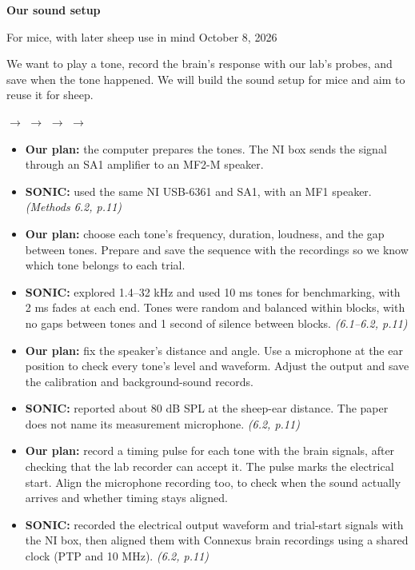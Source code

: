 \documentclass[12pt,letterpaper]{article}
\newcommand{\topic}[1]{\vspace{7pt}{\large\bfseries #1}\par}
\begin{document}
{\LARGE\bfseries Our sound setup}\par
{\color{muted}For mice, with later sheep use in mind \hfill October 8, 2026}\par

We want to play a tone, record the brain's response with our lab's probes, and save when the tone happened. We will build the sound setup for mice and aim to reuse it for sheep.

\topic{How the parts fit together}
\begin{center}
{\small{} $\rightarrow$  $\rightarrow$  $\rightarrow$  $\rightarrow$ }
\end{center}
\begin{itemize}
\item \textbf{Our plan:} the computer prepares the tones. The NI box sends the signal through an SA1 amplifier to an MF2-M speaker.
\item \textbf{SONIC:} used the same NI USB-6361 and SA1, with an MF1 speaker. \textit{(Methods 6.2, p.11)}
\end{itemize}

\topic{1. Decide what to play}
\begin{itemize}
\item \textbf{Our plan:} choose each tone's frequency, duration, loudness, and the gap between tones. Prepare and save the sequence with the recordings so we know which tone belongs to each trial.
\item \textbf{SONIC:} explored 1.4--32 kHz and used 10 ms tones for benchmarking, with 2 ms fades at each end. Tones were random and balanced within blocks, with no gaps between tones and 1 second of silence between blocks. \textit{(6.1--6.2, p.11)}
\end{itemize}

\topic{2. Check what reaches the ear}
\begin{itemize}
\item \textbf{Our plan:} fix the speaker's distance and angle. Use a microphone at the ear position to check every tone's level and waveform. Adjust the output and save the calibration and background-sound records.
\item \textbf{SONIC:} reported about 80 dB SPL at the sheep-ear distance. The paper does not name its measurement microphone. \textit{(6.2, p.11)}
\end{itemize}

\topic{3. Match the sound to the brain recording}
\begin{itemize}
\item \textbf{Our plan:} record a timing pulse for each tone with the brain signals, after checking that the lab recorder can accept it. The pulse marks the electrical start. Align the microphone recording too, to check when the sound actually arrives and whether timing stays aligned.
\item \textbf{SONIC:} recorded the electrical output waveform and trial-start signals with the NI box, then aligned them with Connexus brain recordings using a shared clock (PTP and 10 MHz). \textit{(6.2, p.11)}
\end{itemize}
\end{document}
